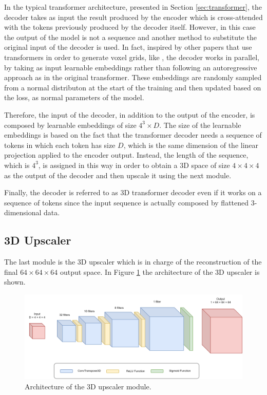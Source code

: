\documentclass[binding=0.6cm,noexaminfo]{sapthesis}
\begin{document}
In the typical transformer architecture, presented in Section \ref{sec:transformer}, the decoder takes as input the result produced by the encoder which is cross-attended with the tokens previously produced by the decoder itself. However, in this case the output of the model is not a sequence and another method to substitute the original input of the decoder is used. In fact, inspired by other papers that use transformers in order to generate voxel grids, like \cite{3d-retr}, the decoder works in parallel, by taking as input learnable embeddings rather than following an autoregressive approach as in the original transformer.
These embeddings are randomly sampled from a normal distributon at the start of the training and then updated based on the loss, as normal parameters of the model.

Therefore, the input of the decoder, in addition to the output of the encoder, is composed by learnable embeddings of size $4^3 \times D$. 
The size of the learnable embeddings is based on the fact that the transformer decoder needs a sequence of tokens in which each token has size $D$, which is the same dimension of the linear projection applied to the encoder output. Instead, the length of the sequence, which is $4^3$, is assigned in this way in order to obtain a 3D space of size $4 \times 4 \times 4$ as the output of the decoder and then upscale it using the next module.

Finally, the decoder is referred to as 3D transformer decoder even if it works on a sequence of tokens since the input sequence is actually composed by flattened 3-dimensional data.

\subsection{3D Upscaler}

The last module is the 3D upscaler which is in charge of the reconstruction of the final $64 \times 64 \times 64$ output space. In Figure \ref{fig:upscaler} the architecture of the 3D upscaler is shown.

\begin{figure}[h!]
\centering
\includegraphics[width=\linewidth]{upscaler}
\caption{Architecture of the 3D upscaler module.}
\label{fig:upscaler}
\end{figure}
\end{document}
